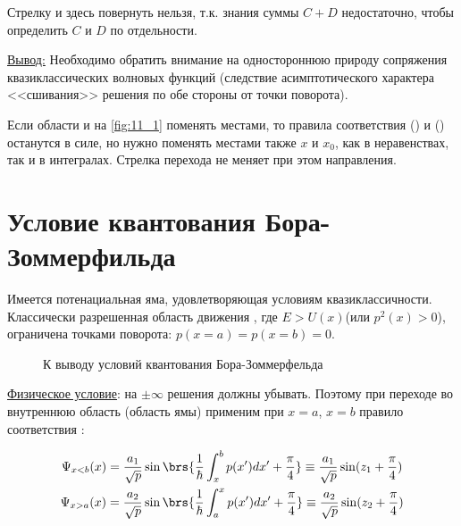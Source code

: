 Стрелку и здесь повернуть нельзя, т.к. знания суммы $C+D$ недостаточно, чтобы определить $C$ и $D$ по отдельности.

\underline{Вывод:} Необходимо обратить внимание на одностороннюю природу сопряжения квазиклассических волновых функций (следствие асимптотического характера <<сшивания>> решения по обе стороны от точки поворота).

Если области  и  на \autoref{fig:11_1} поменять местами, то правила соответствия () и () останутся в силе, но нужно поменять местами также $x$ и $x_0$, как в неравенствах, так и в интегралах. Стрелка перехода не меняет при этом направления.

\section{Условие квантования Бора-Зоммерфильда}

Имеется потенациальная яма, удовлетворяющая условиям квазиклассичности. Классически разрешенная область движения , где $E > U(x)$(или $p^2(x) > 0$), ограничена точками поворота: $p(x=a) = p(x=b) = 0$.

\begin{figure}[h]
\centering
{}
\caption{К выводу условий квантования Бора-Зоммерфельда} \label{fig:11_4}
\end{figure}

\underline{Физическое условие}: на $\pm \infty$ решения должны убывать. Поэтому при переходе во внутреннюю область (область ямы) применим при $x=a$, $x=b$ правило соответствия :

$$
\begin{gathered}
\Psi_{x<b}(x) = \frac{a_1}{\sqrt{p}} \sin\brs{\frac{1}{\hbar} \int_{x}^{b} p(x')dx' + \frac{\pi}{4} } \equiv \frac{a_1}{\sqrt{p}} \sin({z_1 + \frac{\pi}{4}}) \\
\Psi_{x>a}(x) = \frac{a_2}{\sqrt{p}} \sin\brs{\frac{1}{\hbar} \int_{a}^{x} p(x')dx' + \frac{\pi}{4} } \equiv \frac{a_2}{\sqrt{p}} \sin({z_2 + \frac{\pi}{4}})
\end{gathered}
$$

